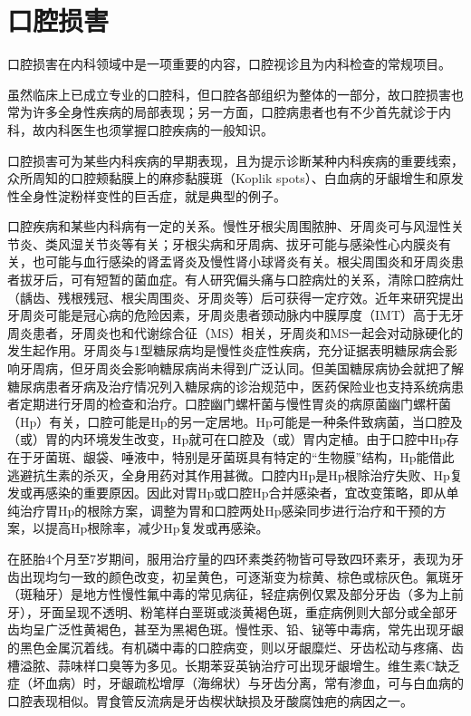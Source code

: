 \chapter{口腔损害}

口腔损害在内科领域中是一项重要的内容，口腔视诊且为内科检查的常规项目。

虽然临床上已成立专业的口腔科，但口腔各部组织为整体的一部分，故口腔损害也常为许多全身性疾病的局部表现；另一方面，口腔病患者也有不少首先就诊于内科，故内科医生也须掌握口腔疾病的一般知识。

口腔损害可为某些内科疾病的早期表现，且为提示诊断某种内科疾病的重要线索，众所周知的口腔颊黏膜上的麻疹黏膜斑（Koplik
spots）、白血病的牙龈增生和原发性全身性淀粉样变性的巨舌症，就是典型的例子。

口腔疾病和某些内科病有一定的关系。慢性牙根尖周围脓肿、牙周炎可与风湿性关节炎、类风湿关节炎等有关；牙根尖病和牙周病、拔牙可能与感染性心内膜炎有关，也可能与血行感染的肾盂肾炎及慢性肾小球肾炎有关。根尖周围炎和牙周炎患者拔牙后，可有短暂的菌血症。有人研究偏头痛与口腔病灶的关系，清除口腔病灶（龋齿、残根残冠、根尖周围炎、牙周炎等）后可获得一定疗效。近年来研究提出牙周炎可能是冠心病的危险因素，牙周炎患者颈动脉内中膜厚度（IMT）高于无牙周炎患者，牙周炎也和代谢综合征（MS）相关，牙周炎和MS一起会对动脉硬化的发生起作用。牙周炎与1型糖尿病均是慢性炎症性疾病，充分证据表明糖尿病会影响牙周病，但牙周炎会影响糖尿病尚未得到广泛认同。但美国糖尿病协会就把了解糖尿病患者牙病及治疗情况列入糖尿病的诊治规范中，医药保险业也支持系统病患者定期进行牙周的检查和治疗。口腔幽门螺杆菌与慢性胃炎的病原菌幽门螺杆菌（Hp）有关，口腔可能是Hp的另一定居地。Hp可能是一种条件致病菌，当口腔及（或）胃的内环境发生改变，Hp就可在口腔及（或）胃内定植。由于口腔中Hp存在于牙菌斑、龈袋、唾液中，特别是牙菌斑具有特定的“生物膜”结构，Hp能借此逃避抗生素的杀灭，全身用药对其作用甚微。口腔内Hp是Hp根除治疗失败、Hp复发或再感染的重要原因。因此对胃Hp或口腔Hp合并感染者，宜改变策略，即从单纯治疗胃Hp的根除方案，调整为胃和口腔两处Hp感染同步进行治疗和干预的方案，以提高Hp根除率，减少Hp复发或再感染。

在胚胎4个月至7岁期间，服用治疗量的四环素类药物皆可导致四环素牙，表现为牙齿出现均匀一致的颜色改变，初呈黄色，可逐渐变为棕黄、棕色或棕灰色。氟斑牙（斑釉牙）是地方性慢性氟中毒的常见病征，轻症病例仅累及部分牙齿（多为上前牙），牙面呈现不透明、粉笔样白垩斑或淡黄褐色斑，重症病例则大部分或全部牙齿均呈广泛性黄褐色，甚至为黑褐色斑。慢性汞、铅、铋等中毒病，常先出现牙龈的黑色金属沉着线。有机磷中毒的口腔病变，则以牙龈糜烂、牙齿松动与疼痛、齿槽溢脓、蒜味样口臭等为多见。长期苯妥英钠治疗可出现牙龈增生。维生素C缺乏症（坏血病）时，牙龈疏松增厚（海绵状）与牙齿分离，常有渗血，可与白血病的口腔表现相似。胃食管反流病是牙齿楔状缺损及牙酸腐蚀疤的病因之一。

